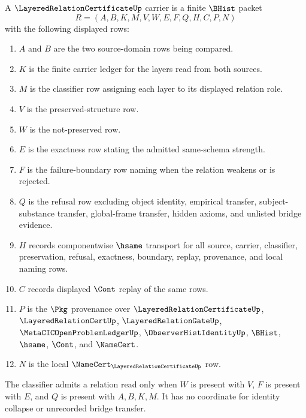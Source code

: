 \begin{definition}
\label{def:layered-relation-certificate-carrier}
A $\LayeredRelationCertificateUp$ carrier is a finite $\BHist$ packet
$$
R=(A,B,K,M,V,W,E,F,Q,H,C,P,N)
$$
with the following displayed rows:
\begin{enumerate}
\item $A$ and $B$ are the two source-domain rows being compared.
\item $K$ is the finite carrier ledger for the layers read from both sources.
\item $M$ is the classifier row assigning each layer to its displayed relation role.
\item $V$ is the preserved-structure row.
\item $W$ is the not-preserved row.
\item $E$ is the exactness row stating the admitted same-schema strength.
\item $F$ is the failure-boundary row naming when the relation weakens or is rejected.
\item $Q$ is the refusal row excluding object identity, empirical transfer, subject-substance transfer, global-frame transfer, hidden axioms, and unlisted bridge evidence.
\item $H$ records componentwise $\hsame$ transport for all source, carrier, classifier, preservation, refusal, exactness, boundary, replay, provenance, and local naming rows.
\item $C$ records displayed $\Cont$ replay of the same rows.
\item $P$ is the $\Pkg$ provenance over $\LayeredRelationCertificateUp$, $\LayeredRelationCertUp$, $\LayeredRelationGateUp$, $\MetaCICOpenProblemLedgerUp$, $\ObserverHistIdentityUp$, $\BHist$, $\hsame$, $\Cont$, and $\NameCert$.
\item $N$ is the local $\NameCert_{\LayeredRelationCertificateUp}$ row.
\end{enumerate}
The classifier admits a relation read only when $W$ is present with $V$, $F$ is present with $E$, and $Q$ is present with $A,B,K,M$. It has no coordinate for identity collapse or unrecorded bridge transfer.
\end{definition}

